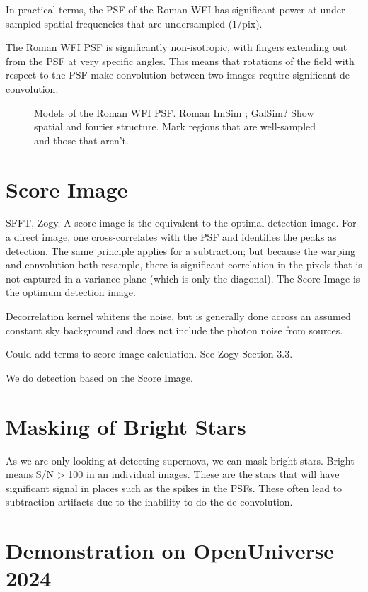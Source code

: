 \documentclass[preprint]{aastex7}
\begin{document}
In practical terms, the PSF of the Roman WFI has significant power at under-sampled spatial frequencies that are undersampled (1/pix).

The Roman WFI PSF is significantly non-isotropic, with fingers extending out from the PSF at very specific angles. 
This means that rotations of the field with respect to the PSF
make convolution between two images require significant de-convolution.

\begin{figure}
\caption{Models of the Roman WFI PSF.  Roman ImSim ; GalSim?
Show spatial and fourier structure.  Mark regions that are well-sampled
and those that aren't.
}
\end{figure}

\section{Score Image}

SFFT, Zogy.
A score image is the equivalent to the optimal detection image.
For a direct image, one cross-correlates with the PSF and identifies
the peaks as detection.
The same principle applies for a subtraction; but because the warping and convolution both resample, there is significant correlation in the pixels that is not captured in a variance plane (which is only the diagonal).
The Score Image is the optimum detection image.

Decorrelation kernel whitens the noise,
but is generally done across an assumed constant sky background 
and does not include the photon noise from sources.

Could add terms to score-image calculation.  See Zogy Section 3.3.

We do detection based on the Score Image.

\section{Masking of Bright Stars}

As we are only looking at detecting supernova, we can mask bright stars.
Bright means S/N > 100 in an individual images.
These are the stars that will have significant signal 
in places such as the spikes in the PSFs.  These often lead to subtraction artifacts due to the inability to do the de-convolution.

\section{Demonstration on OpenUniverse 2024}
\end{document}
